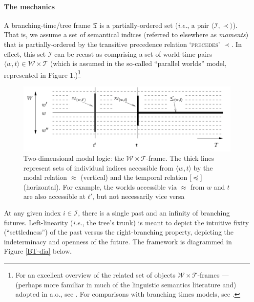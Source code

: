 \documentclass[12pt,dvipsnames]{report}
\begin{document}
\paragraph{The mechanics} A branching-time/tree frame $ \mathfrak T$ is a partially-ordered set (\textit{i.e.}, a pair $\langle \mathcal{I,\prec}\rangle $). That is, we assume a set of semantical indices (referred to elsewhere as \textit{moments}) that is partially-ordered by the transitive precedence relation \textsc{`precedes'} $ \boldsymbol\prec $. In effect, this set $ \mathcal I $ can be recast as comprising a set of world-time pairs $ \langle w,t\rangle\in\mathcal{W\times T} $ (which is assumed in the so-called ``parallel worlds'' model, represented in Figure \ref{KCH-WTframe}.)\footnote{For an excellent overview of the related set of objects $ \mathcal{W\times T} $-frames --- (perhaps more familiar in much of the linguistic semantics literature and) adopted in \citet{Kaufmann2005,Condoravdi2002,Klecha2016a} a.o., see \citet*{Kaufmann2006}. For comparisons with branching times models, see \citealt{Thomason1970,Thomason1984,Rumberg2016}.}


\begin{figure}
	\centering	\caption[$ \mathcal{W\times T}: $Two dimensional modal logic: the Parallel Worlds model]{Two-dimensional modal logic: the $ \mathcal{W\times T} $-frame. The thick lines represent sets of individual indices accessible from $ \langle w,t\rangle $ by the modal relation $ \approx $ (vertical) and the temporal relation [$ \preccurlyeq $] (horizontal). For example, the worlds accessible via $ \approx $ from $ w $ and $ t $ are also accessible at $ t' $, but not necessarily vice versa \citep*[diagram and caption from][95]{Kaufmann2006}}	\label{KCH-WTframe}
	\includegraphics[width=0.8\linewidth]{KCH06-95-WTframe}
	
\end{figure}



At any given index $ i\in\mathcal I $, there is a single past and an infinity of branching futures. Left-linearity (\textit{i.e.}, the tree's trunk) is meant to depict the intuitive fixity (``settledness'') of the past versus the right-branching property, depicting the indeterminacy and openness of the future.
The framework is diagrammed in Figure \ref{BT-dia} below.
\end{document}
